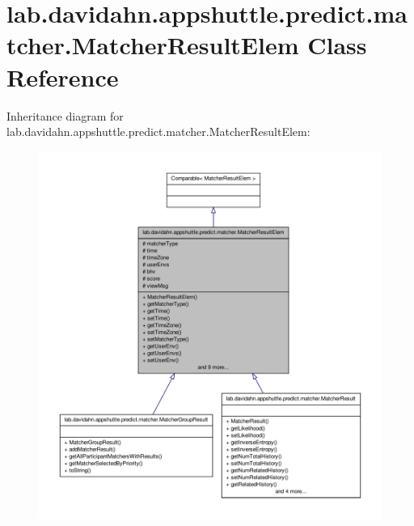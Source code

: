 \hypertarget{classlab_1_1davidahn_1_1appshuttle_1_1predict_1_1matcher_1_1_matcher_result_elem}{\section{lab.\-davidahn.\-appshuttle.\-predict.\-matcher.\-Matcher\-Result\-Elem \-Class \-Reference}
\label{classlab_1_1davidahn_1_1appshuttle_1_1predict_1_1matcher_1_1_matcher_result_elem}
}


\-Inheritance diagram for lab.\-davidahn.\-appshuttle.\-predict.\-matcher.\-Matcher\-Result\-Elem\-:
\nopagebreak
\begin{figure}[H]
\begin{center}
\leavevmode
\includegraphics[width=350pt]{classlab_1_1davidahn_1_1appshuttle_1_1predict_1_1matcher_1_1_matcher_result_elem__inherit__graph}
\end{center}
\end{figure}


